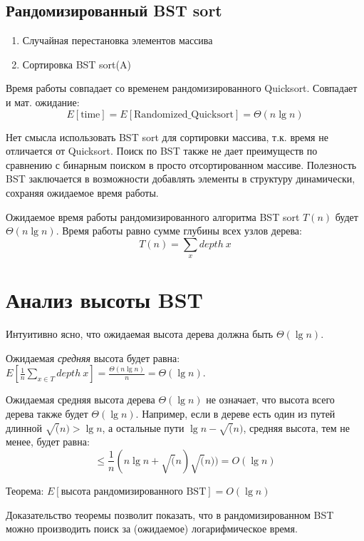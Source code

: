 \documentclass[11pt]{article}
\begin{document}
\subsection{Рандомизированный BST sort}
\begin{enumerate}
\item Случайная перестановка элементов массива
\item Сортировка BST sort(A)
\end{enumerate}

Время работы совпадает со временем рандомизированного Quicksort. Совпадает и
мат. ожидание:
\begin{equation*}
  E[\text{time}] = E[\text{Randomized\_Quicksort}] = \Theta(n \lg n)
\end{equation*}

Нет смысла использовать BST sort для сортировки массива, т.к. время не
отличается от Quicksort. Поиск по BST также не дает преимуществ по сравнению с
бинарным поиском в просто отсортированном массиве. Полезность BST заключается
в возможности добавлять элементы в структуру динамически, сохраняя ожидаемое
время работы.

Ожидаемое время работы рандомизированного алгоритма BST sort $T(n)$ будет
$\Theta(n \lg n)$. Время работы равно сумме глубины всех узлов дерева:
\begin{equation*}
  T(n) = \sum_{x} depth~x
\end{equation*}

\section{Анализ высоты BST}
Интуитивно ясно, что ожидаемая высота дерева должна быть $\Theta(\lg n)$.

Ожидаемая \emph{средняя} высота будет равна: $E[\frac{1}{n}\sum_{x \in T}
depth~x] = \frac{\Theta(n \lg n)}{n} = \Theta(\lg n)$.

Ожидаемая средняя высота дерева $\Theta(\lg n)$ не означает, что высота всего
дерева также будет $\Theta(\lg n)$. Например, если в дереве есть один из путей
длинной $\sqrt(n) > \lg n$, а остальные пути $\lg{n - \sqrt(n)}$, средняя
высота, тем не менее, будет равна:
\begin{equation*}
 \leqslant \frac{1}{n}(n \lg n + \sqrt(n) \sqrt(n)) = O(\lg n)
\end{equation*}

Теорема: $E[\text{высота рандомизированного BST}] = O(\lg n)$

Доказательство теоремы позволит показать, что в рандомизированном BST можно
производить поиск за (ожидаемое) логарифмическое время.
\end{document}
